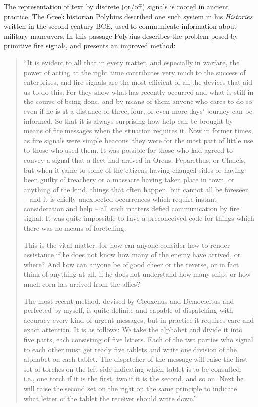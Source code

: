 \vskip 10pt

The representation of text by discrete (on/off) signals is rooted in ancient practice.  The Greek historian Polybius described one such system in his \textit{Histories} written in the second century BCE, used to communicate information about military maneuvers.  In this passage Polybius describes the problem posed by primitive fire signals, and presents an improved method:    

\begin{quote}

``It is evident to all that in every matter, and especially in warfare, the power of acting at the right time contributes very much to the success of enterprises, and fire signals are the most efficient of all the devices that aid us to do this.  For they show what has recently occurred and what is still in the course of being done, and by means of them anyone who cares to do so even if he is at a distance of three, four, or even more days' journey can be informed.  So that it is always surprising how help can be brought by means of fire messages when the situation requires it.  Now in former times, as fire signals were simple beacons, they were for the most part of little use to those who used them.  It was possible for those who had agreed to convey a signal that a fleet had arrived in Oreus, Peparethus, or Chalcis, but when it came to some of the citizens having changed sides or having been guilty of treachery or a massacre having taken place in town, or anything of the kind, things that often happen, but cannot all be foreseen -- and it is chiefly unexpected occurrences which require instant consideration and help -- all such matters defied communication by fire signal.  It was quite impossible to have a preconceived code for things which there was no means of foretelling.

This is the vital matter; for how can anyone consider how to render assistance if he does not know how many of the enemy have arrived, or where?  And how can anyone be of good cheer or the reverse, or in fact think of anything at all, if he does not understand how many ships or how much corn has arrived from the allies?

The most recent method, devised by Cleoxenus and Democleitus and perfected by myself, is quite definite and capable of dispatching with accuracy every kind of urgent messages, but in practice it requires care and exact attention.  It is as follows: We take the alphabet and divide it into five parts, each consisting of five letters.  Each of the two parties who signal to each other must get ready five tablets and write one division of the alphabet on each tablet.  The dispatcher of the message will raise the first set of torches on the left side indicating which tablet is to be consulted; i.e., one torch if it is the first, two if it is the second, and so on.  Next he will raise the second set on the right on the same principle to indicate what letter of the tablet the receiver should write down.''

\end{quote}

